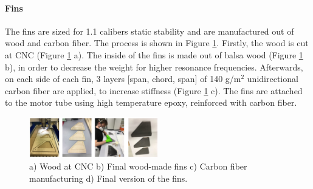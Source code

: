 


\paragraph{Fins}
\hfill \break
    The fins are sized for 1.1 calibers static stability %
    and are manufactured out of wood and carbon fiber. The process is shown in Figure \ref{f:fins}. Firstly, the wood is cut at CNC (Figure \ref{f:fins} a). The inside of the fins is made out of balsa wood (Figure \ref{f:fins} b), in order to decrease the weight for higher resonance frequencies. Afterwards, on each side of each fin, 3 layers [span, chord, span] of 140 g/m$^2$ unidirectional carbon fiber are applied, to increase stiffness (Figure \ref{f:fins} c). The fins are attached to the motor tube using high temperature epoxy, reinforced with carbon fiber.
    \begin{figure}[h!]
        \centering
        \includegraphics[width=0.5\textwidth]{img/fins.jpg}
        \caption{a) Wood at CNC b) Final wood-made fins c) Carbon fiber manufacturing d) Final version of the fins.}
        \label{f:fins}
    \end{figure}

